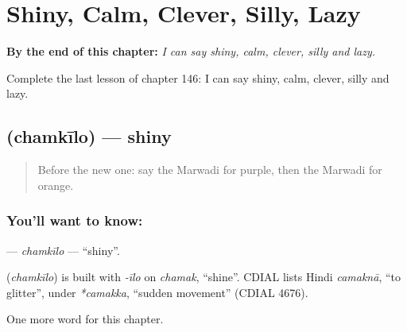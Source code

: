 
\chapter{Shiny, Calm, Clever, Silly, Lazy}
\label{ch:mw-shiny-calm-clever-silly-lazy}

\begin{chapteropening}
\textbf{By the end of this chapter:} \emph{I can say shiny, calm, clever, silly and lazy.}

Complete the last lesson of chapter 146: I can say shiny, calm, clever, silly and lazy.
\end{chapteropening}

\section[\texorpdfstring{\mw{चमकीलो} (chamkīlo)}{चमकीलो (chamkīlo)}]{ (chamkīlo) — shiny}

\label{lesson:MW-C146-chamkilo}



\begin{quote}
Before the new one: say the Marwadi for purple, then the Marwadi for orange.
\end{quote}

\subsection*{You'll want to know: }
\textbf{} — \emph{chamkīlo} — \textquotedblleft{}shiny\textquotedblright{}.

\begin{cousinweb}
\textbf{} (\emph{chamkīlo}) is built with \emph{-īlo} on \emph{chamak}, \textquotedblleft{}shine\textquotedblright{}. CDIAL lists Hindi \emph{camaknā}, \textquotedblleft{}to glitter\textquotedblright{}, under \emph{*camakka}, \textquotedblleft{}sudden movement\textquotedblright{} (CDIAL 4676).
\end{cousinweb}

\begin{grammarlens}[title={What you've built}]
One more word for this chapter.
\end{grammarlens}

